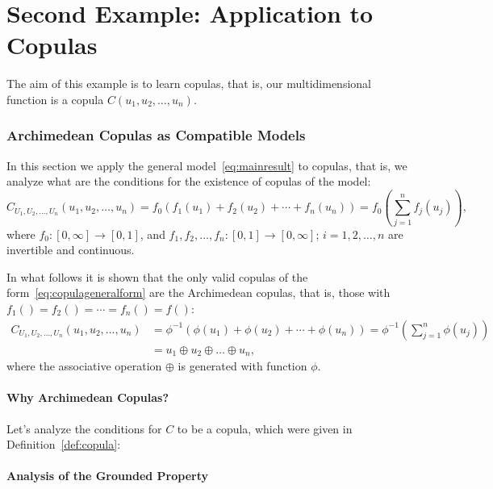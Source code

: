 \documentclass[
	11pt, %
	fleqn, %
	a4paper, %
]{LegrandOrangeBook}
\begin{document}
\chapter{Second Example: Application to Copulas}\label{copulachapter}
\label{ch:copulaapplication}

The aim of this example is to learn copulas, that is, our multidimensional function is a copula $C(u_1,u_2,\ldots,u_n)$.

\subsection{Archimedean Copulas as Compatible Models}
In this section we apply the general model~\eqref{eq:mainresult} to copulas, that is, we analyze what are the conditions for the existence of copulas of the model:
\begin{equation}
C_{U_1,U_2,\ldots,U_n}(u_1,u_2,\ldots,u_n) = f_0(f_1(u_1) + f_2(u_2) + \cdots + f_n(u_n)) = f_0\left(\sum_{j=1}^n f_j(u_j)\right),
\label{eq:copulageneralform}
\end{equation}
where $f_0 : [0,\infty] \to [0,1]$, and $f_1, f_2,\ldots, f_n : [0,1] \to [0,\infty]$; $i = 1,2,\ldots,n$ are invertible and continuous.

In what follows it is shown that the only valid copulas of the form~\eqref{eq:copulageneralform} are the Archimedean copulas, that is, those with $f_1() = f_2() = \cdots = f_n() = f()$:
\begin{align}
C_{U_1,U_2,\ldots,U_n}(u_1,u_2,\ldots,u_n) &= \phi^{-1}(\phi(u_1) + \phi(u_2) + \cdots + \phi(u_n)) = \phi^{-1}\left(\sum_{j=1}^n \phi(u_j)\right) \nonumber\\
&= u_1 \oplus u_2 \oplus \ldots \oplus u_n,
\label{eq:archimedeancopula}
\end{align}
where the associative operation $\oplus$ is generated with function $\phi$.


\subsubsection{Why Archimedean Copulas?}
\label{app:archimedeanproof}
Let's analyze the conditions for $C$ to be a copula, which were given in Definition~\ref{def:copula}:

\subsubsection{Analysis of the Grounded Property}
\end{document}
